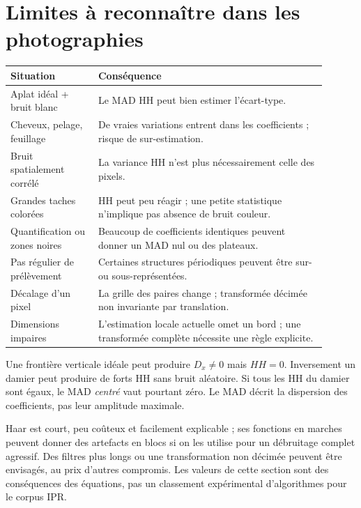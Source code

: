 \section{Limites à reconnaître dans les photographies}
\begin{longtable}{p{0.25\linewidth}p{0.65\linewidth}}
\toprule Situation & Conséquence \\ \midrule
Aplat idéal + bruit blanc & Le MAD HH peut bien estimer l'écart-type.\\
Cheveux, pelage, feuillage & De vraies variations entrent dans les coefficients ; risque de sur-estimation.\\
Bruit spatialement corrélé & La variance HH n'est plus nécessairement celle des pixels.\\
Grandes taches colorées & HH peut peu réagir ; une petite statistique n'implique pas absence de bruit couleur.\\
Quantification ou zones noires & Beaucoup de coefficients identiques peuvent donner un MAD nul ou des plateaux.\\
Pas régulier de prélèvement & Certaines structures périodiques peuvent être sur- ou sous-représentées.\\
Décalage d'un pixel & La grille des paires change ; transformée décimée non invariante par translation.\\
Dimensions impaires & L'estimation locale actuelle omet un bord ; une transformée complète nécessite une règle explicite.\\
\bottomrule
\end{longtable}

Une frontière verticale idéale peut produire $D_x\ne0$ mais $HH=0$.
Inversement un damier peut produire de forts HH sans bruit aléatoire.
Si tous les HH du damier sont égaux, le MAD \emph{centré} vaut pourtant zéro.
Le MAD décrit la dispersion des coefficients, pas leur amplitude maximale.

Haar est court, peu coûteux et facilement explicable ; ses fonctions en
marches peuvent donner des artefacts en blocs si on les utilise pour un
débruitage complet agressif. Des filtres plus longs ou une transformation
non décimée peuvent être envisagés, au prix d'autres compromis. Les valeurs
de cette section sont des conséquences des équations, pas un classement
expérimental d'algorithmes pour le corpus IPR.

